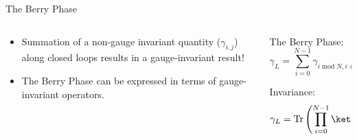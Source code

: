 \documentclass[9pt]{beamer}
\DeclareMathOperator\Tr{Tr}
\begin{document}
\begin{frame}{The Berry Phase}

  \begin{columns}

    \begin{column}{0.5\textwidth}
  
      \begin{itemize}
        \item Summation of a non-gauge invariant quantity ($\gamma_{i,j}$) along closed loops
              results in a gauge-invariant result!
        \item The Berry Phase can be expressed in terms of gauge-invariant operators.
      \end{itemize}

    \end{column}

    \begin{column}{0.5\textwidth}
  
      The Berry Phase:
      \begin{equation*}
        \gamma_{L} = \sum_{i = 0}^{N-1} 
                     \gamma_{i \; \mathrm{mod} \; N, i+1 \; \mathrm{mod} \; N}
      \end{equation*}

      Invariance:
      \begin{equation*}
        \gamma_{L} = \Tr \left( 
                               \prod_{i = 0}^{N-1} \ket{\Psi_{i}} \bra{\Psi_{i}}
                         \right)
      \end{equation*}
    
    \end{column}
  \end{columns}
    
  

\end{frame}
\end{document}
